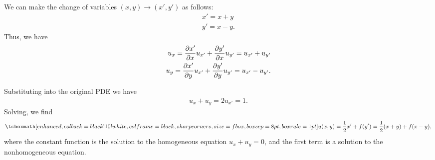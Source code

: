 
We can make the change of variables $(x,y) \rightarrow (x',y')$ as follows:
\begin{align}
    \label{eq:change-var}
    x' = x + y \\
    y' = x - y
.\end{align}
Thus, we have
\begin{align}
    \label{eq:diff-change} 
    u_{x} = \pdv{x'}{x}u_{x'} + \pdv{y'}{x}u_{y'} = u_{x'} + u_{y'} \\
    u_{y} = \pdv{x'}{y}u_{x'} + \pdv{y'}{y}u_{y'} = u_{x'} - u_{y'}
.\end{align}

Substituting into the original PDE we have
\begin{eqnarray}
    \label{eq:changed-eq}
    u_{x} + u_{y} = 2 u_{x'} = 1     
.\end{eqnarray}
Solving, we find
\begin{eqnarray}
    \label{eq:solution-2}
    \eqbox{
    u(x,y) = \frac{1}{2}x' + f(y') = \frac{1}{2}(x + y) + f(x - y)
    }
,\end{eqnarray}
where the constant function is the solution to the homogeneous equation $u_{x} + u_{y} = 0$, and the first term is a solution to the nonhomogeneous equation.




